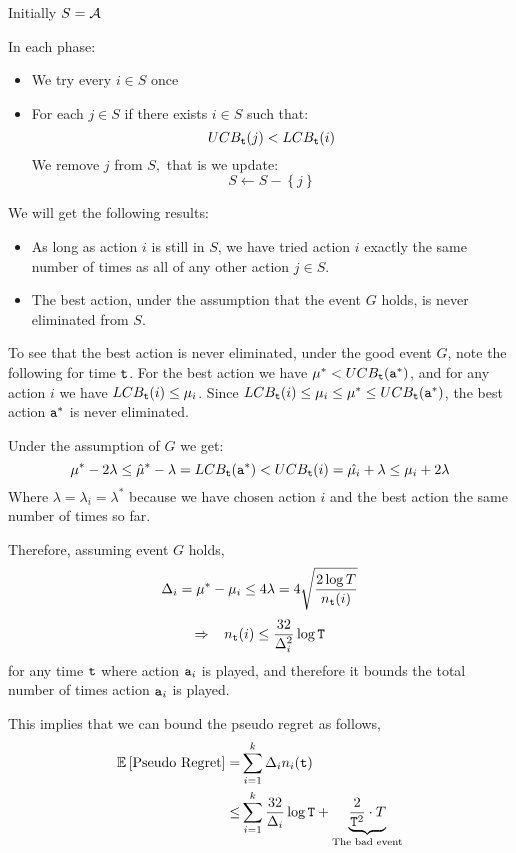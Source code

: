 Initially $S=\mathcal{A}$

In each phase:
\begin{itemize}
\item We try every $i\in S$ once
\item For each $j\in S$ if there exists $i\in S$ such that:
\[
UCB_{{\tt t}}(j)<LCB_{{\tt t}}(i)
\]
 We remove $j$ from $S,$ that is we update:
\[
S\leftarrow S-\left\{ j\right\}
\]
\end{itemize}
We will get the following results:
\begin{itemize}
\item As long as action $i$ is still in $S$, we have tried action $i$ exactly the
same number of times as all of any other action $j\in S$.
\item The best action, under the assumption that the event $G$ holds, is never eliminated
from $S$.
\end{itemize}
To see that the best action is never eliminated, under the good event $G$, note the following for time ${\tt t}$. For the best action we have $\mu^*< UCB_{{\tt t}}({\tt a}^*)$, and for any action $i$ we have $LCB_{\tt t}(i)\leq \mu_i$. Since $LCB_{\tt t}(i)\leq \mu_i\leq \mu^*\leq UCB_{\tt t}({\tt a}^*)$, the best action ${\tt a}^*$ is never eliminated.

Under the assumption of $G$ we get:
\[
\mu^{*}-2\lambda\le\hat{\mu}^{*}-\lambda=LCB_{\tt t}({\tt a}^*)<UCB_{\tt t}(i)=\hat{\mu_{i}}+\lambda\leq\mu_{i}+2\lambda
\]
Where $\lambda=\lambda_{i}=\lambda^{*}$ because we have chosen action $i$ and the best action the same number of times so far.

Therefore, assuming event $G$ holds,
\[
\Delta_{i}=\mu^{*}-\mu_{i}\le4\lambda=4\sqrt{\frac{2\log
T}{n_{{\tt t}}(i)}}
\]
\[
\Rightarrow\;\;\; n_{{\tt t}}(i)\le\frac{32}{\Delta_{i}^{2}}\log {\tt T}
\]
for any time ${\tt t}$ where action ${\tt a}_i$ is played, and therefore it bounds the total number of times action ${\tt a}_i$ is played.

This implies that we can bound the pseudo regret as follows,
\begin{align*}
\mathbb{E}\left[\text{Pseudo Regret}\right]  = &  \sum_{i=1}^{k}\Delta_{i}n_{i}({\tt t})\\
  \le &  \sum_{i=1}^{k}\frac{32}{\Delta_{i}}\log {\tt T}
  +\underbrace{\frac{2}{{\tt T}^{2}}\cdot T}_{\text{The bad event}}
\end{align*}


